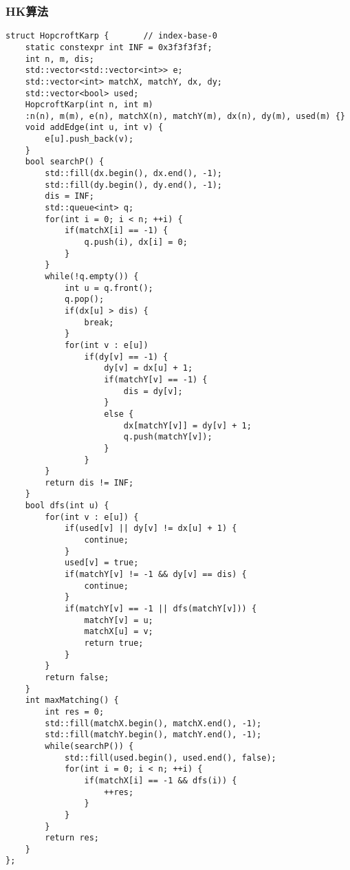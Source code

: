\subsubsection{HK算法}
\begin{lstlisting}
struct HopcroftKarp {		// index-base-0
    static constexpr int INF = 0x3f3f3f3f;
    int n, m, dis;
    std::vector<std::vector<int>> e;
    std::vector<int> matchX, matchY, dx, dy;
    std::vector<bool> used;
    HopcroftKarp(int n, int m)
    :n(n), m(m), e(n), matchX(n), matchY(m), dx(n), dy(m), used(m) {}
    void addEdge(int u, int v) {
        e[u].push_back(v);
    }
    bool searchP() {
        std::fill(dx.begin(), dx.end(), -1);
        std::fill(dy.begin(), dy.end(), -1);
        dis = INF;
        std::queue<int> q;
        for(int i = 0; i < n; ++i) {
            if(matchX[i] == -1) {
                q.push(i), dx[i] = 0;
            }
        }
        while(!q.empty()) {
            int u = q.front(); 
            q.pop();
            if(dx[u] > dis) {
				break;
			}
            for(int v : e[u])
                if(dy[v] == -1) {
                    dy[v] = dx[u] + 1;
                    if(matchY[v] == -1) {
						dis = dy[v];
					}
                    else {
						dx[matchY[v]] = dy[v] + 1;
						q.push(matchY[v]);
					}
                }
        }
        return dis != INF;
    }
    bool dfs(int u) {
        for(int v : e[u]) {
            if(used[v] || dy[v] != dx[u] + 1) {
				continue;
			}
            used[v] = true;
            if(matchY[v] != -1 && dy[v] == dis) {
				continue;
			}
            if(matchY[v] == -1 || dfs(matchY[v])) {
                matchY[v] = u;
                matchX[u] = v;
                return true;
            }
        }
        return false;
    }
    int maxMatching() {
        int res = 0;
        std::fill(matchX.begin(), matchX.end(), -1);
        std::fill(matchY.begin(), matchY.end(), -1);
        while(searchP()) {
            std::fill(used.begin(), used.end(), false);
            for(int i = 0; i < n; ++i) {
				if(matchX[i] == -1 && dfs(i)) {
					++res;
				}
			}
        }
        return res;
    }
};
\end{lstlisting}

